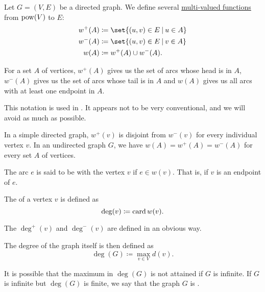 \begin{definition}\label{def:graph_incidence}
  Let \( G = (V, E) \) be a directed graph. We define several \hyperref[def:multi_valued_function]{multi-valued functions} from \( \operatorname{pow}(V) \) to \( E \):
  \begin{align*}
     w^+(A) &\coloneqq \set{ (u, v) \in E \given u \in A } \\
     w^-(A) &\coloneqq \set{ (u, v) \in E \given v \in A } \\
     w(A)   &\coloneqq w^+(A) \cup w^-(A).
  \end{align*}

  For a set \( A \) of vertices, \( w^+(A) \) gives us the set of arcs whose head is in \( A \), \( w^-(A) \) gives us the set of arcs whose tail is in \( A \) and \( w(A) \) gives us all arcs with at least one endpoint in \( A \).

  This notation is used in \cite[ch. 1, sec. 1.4]{GondranMinoux1984Graphs}. It appears not to be very conventional, and we will avoid as much as possible.

  In a simple directed graph, \( w^+(v) \) is disjoint from \( w^-(v) \) for every individual vertex \( v \). In an undirected graph \( G \), we have \( w(A) = w^+(A) = w^-(A) \) for every set \( A \) of vertices.

  \begin{thmenum}
     The arc \( e \) is said to be  with the vertex \( v \) if \( e \in w(v) \). That is, if \( v \) is an endpoint of \( e \).

     The  of a vertex \( v \) is defined as
    \begin{equation*}
      \deg(v) \coloneqq \operatorname{card} w(v).
    \end{equation*}

    The  \( \deg^+(v) \) and  \( \deg^-(v) \) are defined in an obvious way.

    The degree of the graph itself is then defined as
    \begin{equation*}
      \deg(G) \coloneqq \max_{v \in V} d(v).
    \end{equation*}

    It is possible that the maximum in \( \deg(G) \) is not attained if \( G \) is infinite. If \( G \) is infinite but \( \deg(G) \) is finite, we say that the graph \( G \) is .
  \end{thmenum}
\end{definition}

